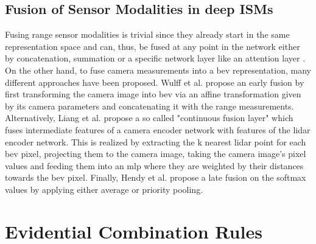 \subsection{Fusion of Sensor Modalities in deep ISMs}
\label{subsec:deep_ism_fusion}
Fusing range sensor modalities is trivial since they already start in the same representation space and can, thus, be fused at any point in the network either by concatenation, summation or a specific network layer like an attention layer \cite{vaswani2017attention}. On the other hand, to fuse camera measurements into a \gls{bev} representation, many different approaches have been proposed. Wulff et al. \cite{wulff2018early} propose an early fusion by first transforming the camera image into \gls{bev} via an affine transformation given by its camera parameters and concatenating it with the range measurements. Alternatively, Liang et al. \cite{liang2018deep} propose a so called "continuous fusion layer" which fuses intermediate features of a camera encoder network with features of the lidar encoder network. This is realized by extracting the k nearest lidar point for each \gls{bev} pixel, projecting them to the camera image, taking the camera image's pixel values and feeding them into an \gls{mlp} where they are weighted by their distances towards the \gls{bev} pixel. Finally, Hendy et al. \cite{hendy2020fishing} propose a late fusion on the softmax values by applying either average or priority pooling.    
%
\section{Evidential Combination Rules}
\label{sec:evidence_theory}
%
